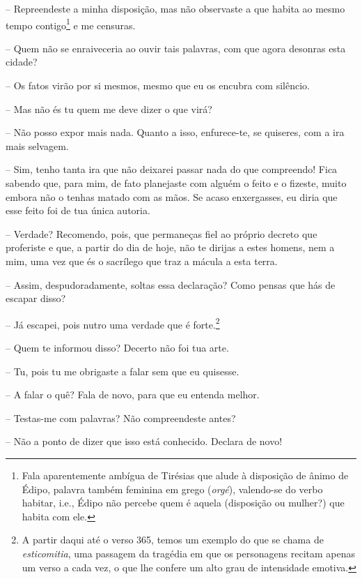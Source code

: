  --   Repreendeste a minha disposição, mas não observaste a que habita ao
mesmo tempo contigo\footnote{Fala aparentemente ambígua de Tirésias que
  alude à disposição de ânimo de Édipo, palavra também feminina em grego
  (\emph{orgé}), valendo-se do verbo habitar, i.e., Édipo não percebe
  quem é aquela (disposição ou mulher?) que habita com ele.} e me
censuras.

 --    Quem não se enraiveceria ao ouvir tais palavras, com que agora
desonras esta cidade?

 --   Os fatos virão por si mesmos, mesmo que eu os encubra com silêncio.

 --   Mas não és tu quem me deve dizer o que virá?

 --   Não posso expor mais nada. Quanto a isso, enfurece-te, se quiseres, com
a ira mais selvagem.

 --   Sim, tenho tanta ira que não deixarei passar nada do que compreendo!
Fica sabendo que, para mim, de fato planejaste com alguém o feito e o
fizeste, muito embora não o tenhas matado com as mãos. Se acaso
enxergasses, eu diria que esse feito foi de tua única autoria.

 --    Verdade? Recomendo, pois, que permaneças fiel ao próprio decreto
que proferiste e que, a partir do dia de hoje, não te dirijas a estes
homens, nem a mim, uma vez que és o sacrílego que traz a mácula a esta
terra.

 --   Assim, despudoradamente, soltas essa declaração? Como pensas que hás de
escapar disso?

 --   Já escapei, pois nutro uma verdade que é forte.\footnote{A partir daqui até o verso 365, temos um
  exemplo do que se chama de \emph{esticomitia}, uma passagem da
  tragédia em que os personagens recitam apenas um verso a cada vez, o
  que lhe confere um alto grau de intensidade emotiva.}

 --   Quem te informou disso? Decerto não foi tua arte.

 --   Tu, pois tu me obrigaste a falar sem que eu quisesse.

 --   A falar o quê? Fala de novo, para que eu entenda melhor.

 --    Testas-me com palavras? Não compreendeste antes?

 --   Não a ponto de dizer que isso está conhecido. Declara de novo!

